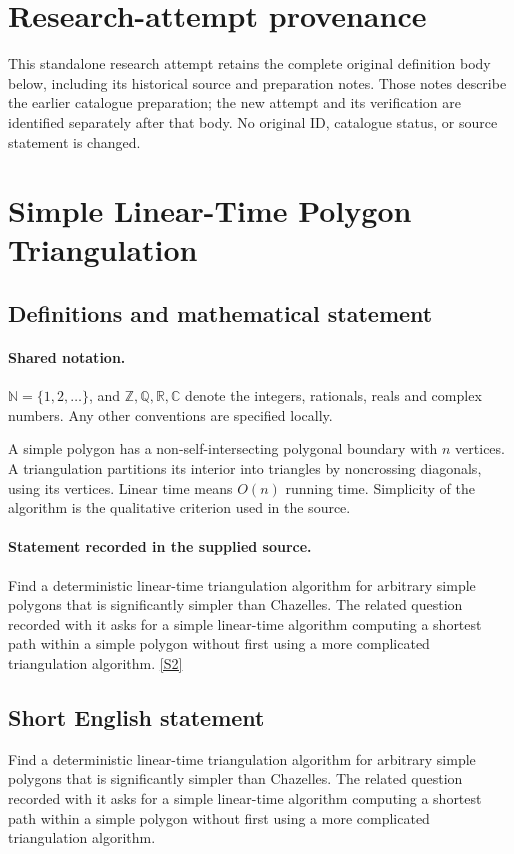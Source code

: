 \documentclass[11pt]{article}
\begin{document}
\section*{Research-attempt provenance}
This standalone research attempt retains the complete original definition body below,
including its historical source and preparation notes. Those notes describe the
earlier catalogue preparation; the new attempt and its verification are identified
separately after that body. No original ID, catalogue status, or source statement is changed.

\section{Simple Linear-Time Polygon Triangulation}\label{statement}

\subsection{Definitions and mathematical statement}

\paragraph{Shared notation.}$\mathbb N=\{1,2,\ldots\}$, and $\mathbb Z,\mathbb Q,\mathbb R,\mathbb C$ denote the integers, rationals, reals and complex numbers. Any other conventions are specified locally.


A simple polygon has a non-self-intersecting polygonal boundary with $n$ vertices. A triangulation partitions its interior into triangles by noncrossing diagonals, using its vertices. Linear time means $O(n)$ running time. Simplicity of the algorithm is the qualitative criterion used in the source.
\paragraph{Statement recorded in the supplied source.}
Find a deterministic linear-time triangulation algorithm for arbitrary simple polygons that is significantly simpler than Chazelle\textquotesingle s. The related question recorded with it asks for a simple linear-time algorithm computing a shortest path within a simple polygon without first using a more complicated triangulation algorithm. \href{https://github.com/edemaine/topp/blob/main/Problems/P.000010}{[S2]}
\subsection{Short English statement}
Find a deterministic linear-time triangulation algorithm for arbitrary simple polygons that is significantly simpler than Chazelle\textquotesingle s. The related question recorded with it asks for a simple linear-time algorithm computing a shortest path within a simple polygon without first using a more complicated triangulation algorithm.
\end{document}
